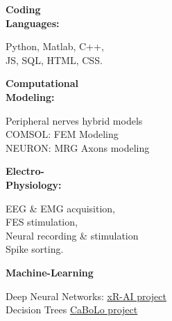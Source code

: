 \documentclass[9pt]{developercv} %
\begin{document}
\begin{minipage}[t]{0.52\textwidth}
    \vspace{-6pt}
    
    \begin{minipage}[t]{0.28\textwidth}
        \textbf{Coding \\ Languages:}
    \end{minipage}
    \hfill
    \begin{minipage}[t]{0.70\textwidth}
      Python, Matlab, C++, \\ JS, SQL, HTML, CSS.
    \end{minipage}
    \vspace{4mm}

    \begin{minipage}[t]{0.28\textwidth}
        \textbf{Computational \\ Modeling:}
    \end{minipage}
    \hfill
    \begin{minipage}[t]{0.70\textwidth}
      Peripheral nerves hybrid models\\
      \textbullet{} COMSOL: FEM Modeling \\
      \textbullet{} NEURON: MRG Axons modeling
    \end{minipage}
    \vspace{4mm}
    
    \begin{minipage}[t]{0.28\textwidth}
        \textbf{Electro-\\ Physiology:}
    \end{minipage}
    \hfill
    \begin{minipage}[t]{0.70\textwidth}
      EEG \& EMG acquisition,\\ FES stimulation,\\ 
      Neural recording \& stimulation\\
      Spike sorting.\\
    \end{minipage}

    \begin{minipage}[t]{0.28\textwidth}
        \textbf{Machine-Learning }
    \end{minipage}
    \hfill
    \begin{minipage}[t]{0.70\textwidth}
      Deep Neural Networks:
      {\textcolor{blue}{\href{https://github.com/ChiaraBoscarino/XrAI/blob/main/XrAI_scientific_report.pdf}{\underline{xR-AI project}}}}\\
      Decision Trees
      {\textcolor{blue}{\href{https://github.com/FilippoCastellani/CaBoLo/blob/main/Report_BSP_Lab_Assignment.pdf}{\underline{CaBoLo project}}}}\\
    \end{minipage}


\end{minipage}
\end{document}
